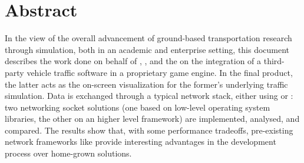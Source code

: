 \chapter*{Abstract}\label{ch:abstract}

In the view of the overall advancement of ground-based transportation research through simulation, both in an academic and enterprise setting, this document describes the work done on behalf of , , and the  on the integration of a third-party vehicle traffic software in a proprietary game engine. In the final product, the latter acts as the on-screen visualization for the former's underlying traffic simulation. Data is exchanged through a typical network stack, either using  or : two networking socket solutions (one based on low-level operating system libraries, the other on an higher level framework) are implemented, analysed, and compared. The results show that, with some performance tradeoffs, pre-existing network frameworks like  provide interesting advantages in the development process over home-grown solutions.
